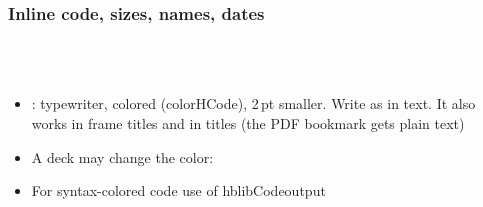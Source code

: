 \documentclass[aspectratio=169,10pt,compress]{beamer}
\begin{document}
\begin{frame}[t,fragile] \frametitle{Inline code, sizes, names, dates}

\begin{texcode}
        
  
    \cisOOO    \cisOOT    \hbTimeStamp    \hbTimeStampDraft
\end{texcode}

	\begin{center}
		 \quad {} \quad {}\\[2pt]
		 \quad {}\\[2pt]
		 \quad \cisOOO \quad \cisOOT \quad \hbTimeStamp \quad \hbTimeStampDraft
	\end{center}

	\begin{itemize}\small
		\item {}: typewriter, colored (colorHCode), 2\,pt smaller.
		Write \hCode{\textbackslash \_ \textbackslash \{ \textbackslash \}} as in text.
		It also works in frame titles and in  titles (the PDF bookmark gets plain text)
		\item A deck may change the color: 
		\item For syntax-colored code use  of hblibCodeoutput
	\end{itemize}
\end{frame}




\end{document}
